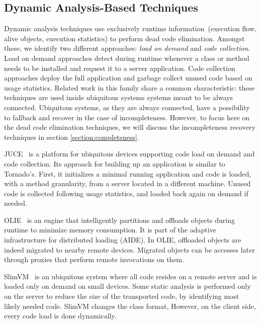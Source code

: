 
\subsection{Dynamic Analysis-Based Techniques}\label{section:dynamic_rw}

Dynamic analysis techniques use exclusively runtime information~(\ie execution flow, alive objects, execution statistics) to perform dead code elimination. Amongst these, we identify two different approaches: \emph{load on demand} and \emph{code collection}. Load on demand approaches detect during runtime whenever a class or method needs to be installed and request it to a server application. Code collection approaches deploy the full application  and garbage collect unused code based on usage statistics. Related work in this family share a common characteristic: these techniques are used inside ubiquitous systems \ie systems meant to be always connected. Ubiquitous systems, as they are always connected, have a possibility to fallback and recover in the case of incompleteness. However, to focus here on the dead code elimination techniques, we will discuss the incompleteness recovery techniques in section \ref{section:completeness}.

JUCE~\cite{ShortPopa04a,ShortTeod01a} is a platform for ubiquitous devices supporting code load on demand and code collection. Its approach for building up an application is similar to Tornado's. First, it initializes a minimal running application and code is loaded, with a method granularity, from a server located in a different machine. Unused code is collected following usage statistics, and loaded back again on demand if needed.

OLIE~\cite{Gu03a} is an engine that intelligently partitions and offloads objects during runtime to minimize memory consumption. It is part of the adaptive infrastructure for distributed loading (AIDE). In OLIE, offloaded objects are indeed migrated to nearby remote devices. Migrated objects can be accesses later through proxies that perform remote invocations on them.

SlimVM~\cite{Kers09a, Wagn11a} is an ubiquitous system where all code resides on a remote server and is loaded only on demand on small devices. Some static analysis is performed only on the server to reduce the size of the transported code, by identifying most likely needed code. SlimVM changes the class format,  However, on the client side, every code load is done dynamically.

